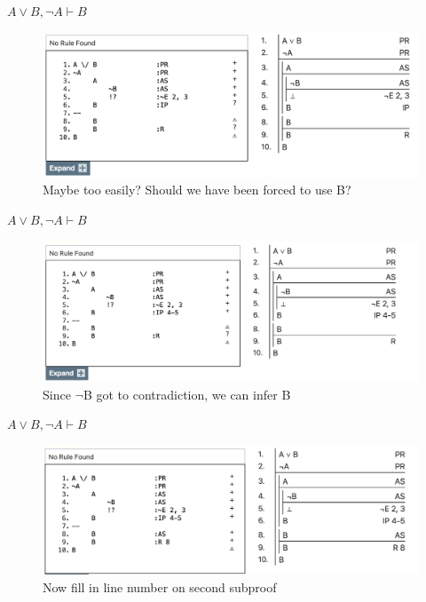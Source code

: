 \documentclass[
  ignorenonframetext,
]{beamer}
\renewcommand{\,}{\text{, }}
\begin{document}
\begin{frame}{\(A \vee B, \neg A \vdash B\)}
\protect\hypertarget{a-vee-b-neg-a-vdash-b-5}{}
\begin{figure}
\centering
\includegraphics[width=\textwidth,height=0.75\textheight]{5_6d.png}
\caption{Maybe too easily? Should we have been forced to use B?}
\end{figure}
\end{frame}

\begin{frame}{\(A \vee B, \neg A \vdash B\)}
\protect\hypertarget{a-vee-b-neg-a-vdash-b-6}{}
\begin{figure}
\centering
\includegraphics[width=\textwidth,height=0.75\textheight]{5_6e.png}
\caption{Since \(\neg\)B got to contradiction, we can infer B}
\end{figure}
\end{frame}

\begin{frame}{\(A \vee B, \neg A \vdash B\)}
\protect\hypertarget{a-vee-b-neg-a-vdash-b-7}{}
\begin{figure}
\centering
\includegraphics[width=\textwidth,height=0.75\textheight]{5_6g.png}
\caption{Now fill in line number on second subproof}
\end{figure}
\end{frame}
\end{document}

